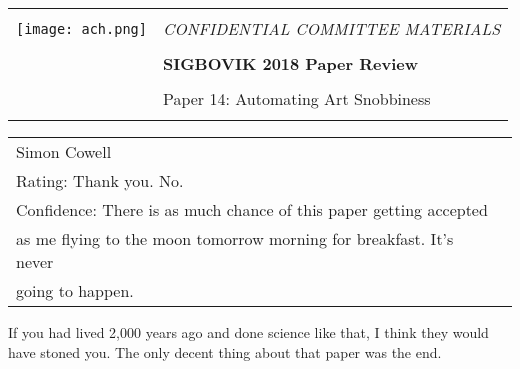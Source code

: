 \documentclass[12pt]{article}
\begin{document}
{\sffamily
\begin{tabular}{ll}
\multirow{3}{*}{\texttt{[image: ach.png]}}\\
& \Large{\em CONFIDENTIAL COMMITTEE MATERIALS} \\
&\\
& \textbf{\Huge{SIGBOVIK 2018 Paper Review}} \\
&\\
& \LARGE{Paper 14: Automating Art Snobbiness} \\[0.25em]
&\\
\hline
\end{tabular}}
\vspace{2em}
\thispagestyle{empty}

{\large\bf
\begin{tabular}{ll}
Simon Cowell\\
Rating: Thank you. No. \\
  Confidence: There is as much chance of this paper getting accepted \\
  as me flying to the moon tomorrow morning for breakfast. It's never \\
  going to happen.\\
\end{tabular}}
\vspace{1em}

If you had lived 2,000 years ago and done science like that, I think they would have stoned you.
The only decent thing about that paper was the end.
\end{document}
